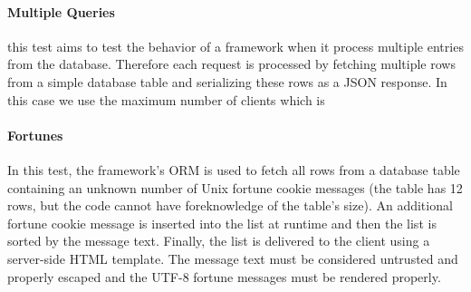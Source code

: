 \paragraph{Multiple Queries}
this test aims to test the behavior of a framework when it process multiple entries from the database.
Therefore each request is processed by fetching multiple rows from a simple database table and serializing these rows as a JSON response.
In this case we use the maximum number of clients which is 
\paragraph{Fortunes}
In this test, the framework's ORM is used to fetch all rows from a database table containing an unknown number of Unix fortune cookie messages (the table has 12 rows, but the code cannot have foreknowledge of the table's size). An additional fortune cookie message is inserted into the list at runtime and then the list is sorted by the message text. Finally, the list is delivered to the client using a server-side HTML template. The message text must be considered untrusted and properly escaped and the UTF-8 fortune messages must be rendered properly.

